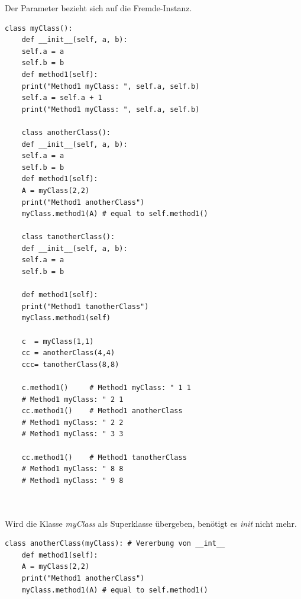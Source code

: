 Der Parameter \textit{} bezieht sich auf die Fremde-Instanz.
\begin{lstlisting}[style=python]
	class myClass():
	def __init__(self, a, b):
	self.a = a
	self.b = b
	def method1(self):
	print("Method1 myClass: ", self.a, self.b)
	self.a = self.a + 1
	print("Method1 myClass: ", self.a, self.b)
	
	class anotherClass():
	def __init__(self, a, b):
	self.a = a
	self.b = b
	def method1(self):
	A = myClass(2,2)
	print("Method1 anotherClass")
	myClass.method1(A) # equal to self.method1()
	
	class tanotherClass():
	def __init__(self, a, b):
	self.a = a
	self.b = b
	
	def method1(self):
	print("Method1 tanotherClass")
	myClass.method1(self)
	
	c  = myClass(1,1)
	cc = anotherClass(4,4)
	ccc= tanotherClass(8,8)
	
	c.method1() 	# Method1 myClass: " 1 1
	# Method1 myClass: " 2 1
	cc.method1() 	# Method1 anotherClass
	# Method1 myClass: " 2 2
	# Method1 myClass: " 3 3
	
	cc.method1() 	# Method1 tanotherClass
	# Method1 myClass: " 8 8
	# Method1 myClass: " 9 8
	
	
\end{lstlisting} 
Wird die Klasse \textit{myClass} als Superklasse übergeben, benötigt es \textit{init} nicht mehr.
\begin{lstlisting}[style=python]
	class anotherClass(myClass): # Vererbung von __int__
	def method1(self):
	A = myClass(2,2)
	print("Method1 anotherClass")
	myClass.method1(A) # equal to self.method1()
\end{lstlisting}


